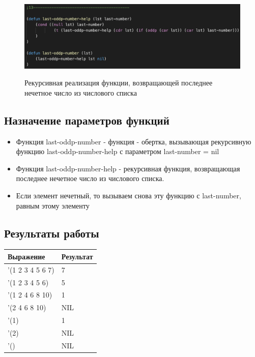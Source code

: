 \documentclass[a4paper,12pt]{article}
\begin{document}
 	\begin{figure}[h!]
 		\begin{center}
 			{\includegraphics[scale = 0.7]{6.13.png}}
 			\label{ris:6.13}
 		\end{center}
 	\caption{Рекурсивная реализация функции, возвращающей последнее нечетное число из числового списка}
 	\end{figure}
 	
 	\subsection*{Назначение параметров функций}
 	
 	\begin{itemize}
 		\item Функция last-oddp-number - функция - обертка, вызывающая рекурсивную функцию last-oddp-number-help с параметром last-number = nil
 		\item Функция last-oddp-number-help - рекурсивная функция, возвращающая последнее нечетное число из числового списка.
 		\item Если элемент нечетный, то вызываем снова эту функцию с last-number, равным этому элементу
 	\end{itemize}
 	
 	\subsection*{Результаты работы}
 	
 	 	 	\begin{table} [h!]
 		\begin{center}
 			\begin{tabular}{|l|l|}
 				\hline
 				{\bf  Выражение} & {\bf Результат} \\
 				\hline
 				{'(1 2 3 4 5 6 7)} & 7\\
 				\hline
 				{'(1 2 3 4 5 6)} & 5\\
 				\hline
 				{'(1 2 4 6 8 10)} & 1\\
 				\hline
 				{'(2 4 6 8 10)} & NIL\\
 				\hline
 				{'(1)} & 1\\
 				\hline
 				{'(2)} & NIL\\
 				\hline
 				{'()} & NIL\\
 				\hline
 			\end{tabular}  
 			\label{m2}
 		\end{center}
 	\end{table}
 	
\end{document}
